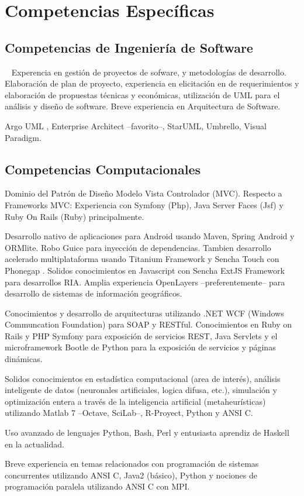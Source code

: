 \section{Competencias Espec\'ificas}
\subsection{Competencias de Ingenier\'ia de Software}\
	{Experencia en gestión de proyectos de sofware, y metodologías de desarrollo. 
	Elaboración de plan de proyecto, experiencia en elicitación en  de requerimientos 
	y elaboración de propuestas técnicas y económicas, utilización de UML para el análisis y diseño 
	de software. Breve experiencia en Arquitectura de Software.}
	
	{Argo UML , Enterprise Architect --favorito--, StarUML, Umbrello, Visual Paradigm.}

\subsection{Competencias Computacionales}
	{Dominio del Patrón de Diseño Modelo Vista Controlador (MVC).
	Respecto a Frameworks MVC: Experiencia con Symfony (Php), 
	Java Server Faces (Jsf) y Ruby On Rails (Ruby) principalmente.}

	{Desarrollo nativo de aplicaciones para Android usando Maven, Spring Android y ORMlite. Robo Guice para inyección de dependencias. Tambien desarrollo acelerado multiplataforma usando Titanium Framework y Sencha Touch con Phonegap . }
\cvline{Javascript}
	{Solidos conocimientos en Javascript con Sencha ExtJS Framework para desarrollos RIA.
	 Amplia experiencia OpenLayers --preferentemente-- para desarrollo de sistemas de información geográficos. }

	{Conocimientos y desarrollo de arquitecturas utilizando .NET WCF 
	(Windows Communcation Foundation) para SOAP y RESTful. Conocimientos en Ruby on Rails y PHP Symfony para exposición de servicios REST, 
	Java Servlets y el microframework Bootle de Python para la exposición de 
	servicios y páginas dinámicas.}	
	
	{Solidos conocimientos en estad\'istica 
	computacional (area de interés), análisis inteligente de datos (neuronales
    artificiales, logica difusa, etc.), simulación y optimización entera a
    través de la inteligencia artificial (metaheurísticas) utilizando Matlab 7 --Octave, SciLab--, R-Proyect, Python y ANSI C.}

	{Uso avanzado de lenguajes Python, Bash, Perl y entusiasta aprendiz de
    Haskell en la actualidad.}
	
	{Breve experiencia en temas relacionados con programaci\'on de sistemas concurrentes utilizando ANSI C, Java2 (básico), Python y nociones de programación paralela utilizando ANSI C con MPI.}



